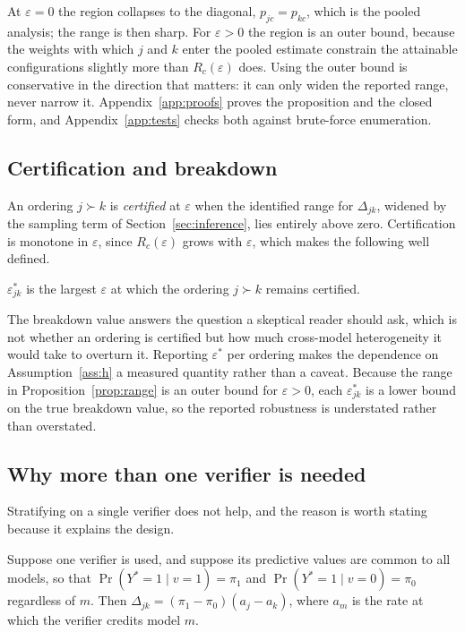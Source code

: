 At $\varepsilon = 0$ the region collapses to the diagonal, $p_{jc} = p_{kc}$, which is the
pooled analysis; the range is then sharp. For $\varepsilon > 0$ the region is an outer bound,
because the weights with which $j$ and $k$ enter the pooled estimate constrain the attainable
configurations slightly more than $R_c(\varepsilon)$ does. Using the outer bound is
conservative in the direction that matters: it can only widen the reported range, never narrow
it. Appendix~\ref{app:proofs} proves the proposition and the closed form, and
Appendix~\ref{app:tests} checks both against brute-force enumeration.

\subsection{Certification and breakdown}

An ordering $j \succ k$ is \emph{certified} at $\varepsilon$ when the identified range for
$\Delta_{jk}$, widened by the sampling term of Section~\ref{sec:inference}, lies entirely
above zero. Certification is monotone in $\varepsilon$, since $R_c(\varepsilon)$ grows with
$\varepsilon$, which makes the following well defined.

\begin{definition}
\label{def:breakdown}
$\varepsilon^*_{jk}$ is the largest $\varepsilon$ at which the ordering $j \succ k$ remains
certified.
\end{definition}

The breakdown value answers the question a skeptical reader should ask, which is not whether
an ordering is certified but how much cross-model heterogeneity it would take to overturn it.
Reporting $\varepsilon^*$ per ordering makes the dependence on Assumption~\ref{ass:h} a
measured quantity rather than a caveat. Because the range in Proposition~\ref{prop:range} is
an outer bound for $\varepsilon > 0$, each $\varepsilon^*_{jk}$ is a lower bound on the true
breakdown value, so the reported robustness is understated rather than overstated.

\subsection{Why more than one verifier is needed}

Stratifying on a single verifier does not help, and the reason is worth stating because it
explains the design.

\begin{proposition}
\label{prop:oneverifier}
Suppose one verifier is used, and suppose its predictive values are common to all models, so
that $\Pr(Y^* = 1 \mid v = 1) = \pi_1$ and $\Pr(Y^* = 1 \mid v = 0) = \pi_0$ regardless of $m$.
Then $\Delta_{jk} = (\pi_1 - \pi_0)(a_j - a_k)$, where $a_m$ is the rate at which the verifier
credits model $m$.
\end{proposition}


